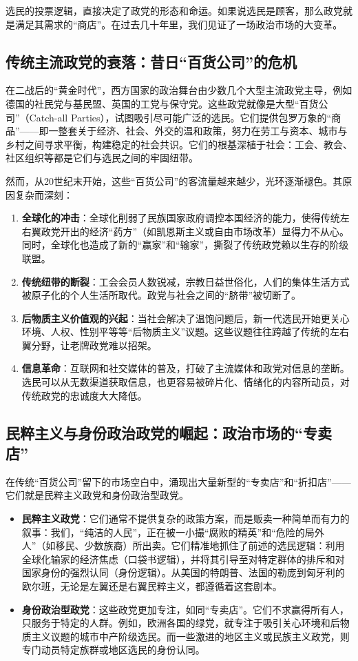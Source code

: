\documentclass[a5paper, 11pt, openany]{ctexbook}
\begin{document}
选民的投票逻辑，直接决定了政党的形态和命运。如果说选民是顾客，那么政党就是满足其需求的“商店”。在过去几十年里，我们见证了一场政治市场的大变革。

\subsection{传统主流政党的衰落：昔日“百货公司”的危机}

在二战后的“黄金时代”，西方国家的政治舞台由少数几个大型主流政党主导，例如德国的社民党与基民盟、英国的工党与保守党。这些政党就像是大型“百货公司”（Catch-all Parties），试图吸引尽可能广泛的选民。它们提供包罗万象的“商品”——即一整套关于经济、社会、外交的温和政策，努力在劳工与资本、城市与乡村之间寻求平衡，构建稳定的社会共识。它们的根基深植于社会：工会、教会、社区组织等都是它们与选民之间的牢固纽带。

然而，从20世纪末开始，这些“百货公司”的客流量越来越少，光环逐渐褪色。其原因复杂而深刻：
\begin{enumerate}
    \item \textbf{全球化的冲击}：全球化削弱了民族国家政府调控本国经济的能力，使得传统左右翼政党开出的经济“药方”（如凯恩斯主义或自由市场改革）显得力不从心。同时，全球化也造成了新的“赢家”和“输家”，撕裂了传统政党赖以生存的阶级联盟。
    \item \textbf{传统纽带的断裂}：工会会员人数锐减，宗教日益世俗化，人们的集体生活方式被原子化的个人生活所取代。政党与社会之间的“脐带”被切断了。
    \item \textbf{后物质主义价值观的兴起}：当社会解决了温饱问题后，新一代选民开始更关心环境、人权、性别平等等“后物质主义”议题。这些议题往往跨越了传统的左右翼分野，让老牌政党难以招架。
    \item \textbf{信息革命}：互联网和社交媒体的普及，打破了主流媒体和政党对信息的垄断。选民可以从无数渠道获取信息，也更容易被碎片化、情绪化的内容所动员，对传统政党的忠诚度大大降低。
\end{enumerate}

\subsection{民粹主义与身份政治政党的崛起：政治市场的“专卖店”}

在传统“百货公司”留下的市场空白中，涌现出大量新型的“专卖店”和“折扣店”——它们就是民粹主义政党和身份政治型政党。
\begin{itemize}
    \item \textbf{民粹主义政党}：它们通常不提供复杂的政策方案，而是贩卖一种简单而有力的叙事：我们，“纯洁的人民”，正在被一小撮“腐败的精英”和“危险的局外人”（如移民、少数族裔）所出卖。它们精准地抓住了前述的选民逻辑：利用全球化输家的经济焦虑（口袋书逻辑），并将其引导至对特定群体的排斥和对国家身份的强烈认同（身份逻辑）。从美国的特朗普、法国的勒庞到匈牙利的欧尔班，无论是左翼还是右翼民粹主义，都遵循着这套剧本。
    \item \textbf{身份政治型政党}：这些政党更加专注，如同“专卖店”。它们不求赢得所有人，只服务于特定的人群。例如，欧洲各国的绿党，就专注于吸引关心环境和后物质主义议题的城市中产阶级选民。而一些激进的地区主义或民族主义政党，则专门动员特定族群或地区选民的身份认同。
\end{itemize}
\end{document}

